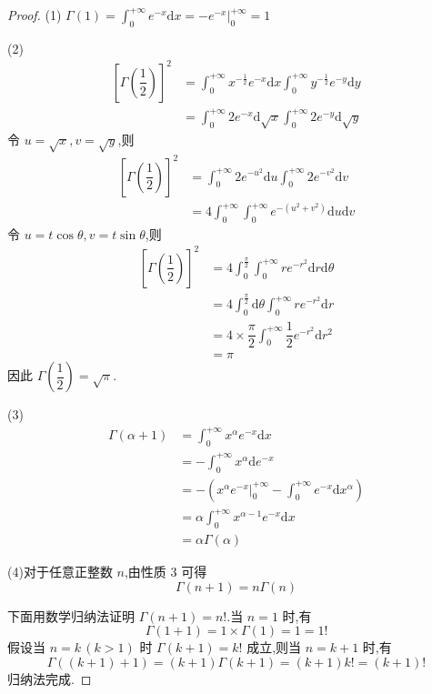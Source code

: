 \begin{proof}
    (1) $\Gamma(1) = \displaystyle\int_{0}^{+\infty} e^{-x} \text{d}x = -e^{-x} \Big|_0^{+\infty} = 1$

    (2)
    $$
    \begin{aligned}
        \left[ \Gamma(\dfrac{1}{2}) \right]^2 &= \int_{0}^{+\infty} x^{-\frac{1}{2}} e^{-x} \text{d}x \int_{0}^{+\infty} y^{-\frac{1}{2}} e^{-y} \text{d}y \\
        &= \int_{0}^{+\infty} 2 e^{-x} \text{d} \sqrt{x} \int_{0}^{+\infty} 2 e^{-y} \text{d} \sqrt{y}
    \end{aligned}
    $$
    令 $u = \sqrt{x}, v = \sqrt{y}$,则
    $$
    \begin{aligned}
        \left[ \Gamma(\dfrac{1}{2}) \right]^2 &= \int_{0}^{+\infty} 2 e^{-u^2} \text{d}u \int_{0}^{+\infty} 2 e^{-v^2} \text{d}v \\
        &= 4 \int_{0}^{+\infty} \int_{0}^{+\infty} e^{-(u^2 + v^2)} \text{d}u \text{d}v
    \end{aligned}
    $$
    令 $u = t \cos\theta, v = t \sin\theta$,则
    $$
    \begin{aligned}
        \left[ \Gamma(\dfrac{1}{2}) \right]^2 &= 4 \int_{0}^{\frac{\pi}{2}} \int_{0}^{+\infty} r e^{-r^2} \text{d}r \text{d} \theta \\
        &= 4 \int_{0}^{\frac{\pi}{2}} \text{d} \theta \int_{0}^{+\infty} r e^{-r^2} \text{d}r \\
        &= 4 \times \dfrac{\pi}{2} \int_{0}^{+\infty} \dfrac{1}{2} e^{-r^2} \text{d}r^2 \\
        &= \pi
    \end{aligned}
    $$
    因此 $\Gamma(\dfrac{1}{2}) = \sqrt{\pi}$.

    \vspace{0.5em}

    (3)
    $$
    \begin{aligned}
        \Gamma(\alpha + 1) &= \int_{0}^{+\infty} x^{\alpha} e^{-x} \text{d}x \\
        &= -\int_{0}^{+\infty} x^{\alpha} \text{d} e^{-x} \\
        &= -\left( x^{\alpha} e^{-x} \Big|_0^{+\infty} - \int_{0}^{+\infty} e^{-x} \text{d} x^{\alpha} \right) \\
        &= \alpha \int_{0}^{+\infty} x^{\alpha - 1} e^{-x} \text{d}x \\
        &= \alpha \Gamma(\alpha)
    \end{aligned}
    $$

    (4)对于任意正整数 $n$,由性质 3 可得
    $$
    \Gamma(n+1) = n \Gamma(n)
    $$

    下面用数学归纳法证明 $\Gamma(n+1) = n!$.当 $n=1$ 时,有
    $$
    \Gamma(1+1) = 1 \times \Gamma(1) = 1 = 1!
    $$
    假设当 $n = k \, (k>1)$ 时 $\Gamma(k+1) = k!$ 成立,则当 $n=k+1$ 时,有
    $$
    \Gamma((k+1)+1) = (k+1) \Gamma(k+1) = (k+1) k! = (k+1)!
    $$
    归纳法完成.
\end{proof}


